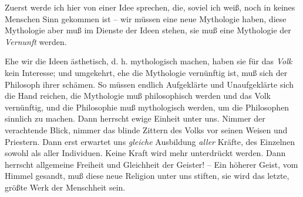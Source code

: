 \documentclass[12pt,letterpaper]{article} %
\begin{document}
Zuerst werde ich hier von einer Idee sprechen, die, soviel ich weiß, noch in keines Menschen Sinn gekommen ist – wir müssen eine neue Mythologie haben, diese Mythologie aber muß im Dienste der Ideen stehen, sie muß eine Mythologie der \textit{Vernunft} werden.

Ehe wir die Ideen ästhetisch, d. h. mythologisch machen, haben sie für das \textit{Volk} kein Interesse; und umgekehrt, ehe die Mythologie vernünftig ist, muß sich der Philosoph ihrer schämen. So müssen endlich Aufgeklärte und Unaufgeklärte sich die Hand reichen, die Mythologie muß philosophisch werden und das Volk vernünftig, und die Philosophie muß mythologisch werden, um die Philosophen sinnlich zu machen. Dann herrscht ewige Einheit unter uns. Nimmer der verachtende Blick, nimmer das blinde Zittern des Volks vor seinen Weisen und Priestern. Dann erst erwartet uns \textit{gleiche} Ausbildung \textit{aller} Kräfte, des Einzelnen sowohl als aller Individuen. Keine Kraft wird mehr unterdrückt werden. Dann herrscht allgemeine Freiheit und Gleichheit der Geister! – Ein höherer Geist, vom Himmel gesandt, muß diese neue Religion unter uns stiften, sie wird das letzte, größte Werk der Menschheit sein.
\end{document}
